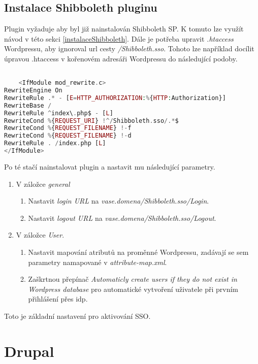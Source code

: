 \subsection{Instalace Shibboleth pluginu} %
Plugin vyžaduje aby byl již nainstalován Shibboleth SP. K tomuto lze využít návod v této sekci \ref{instalaceShibboleth}. Dále je potřeba upravit \emph{.htaccess} Wordpressu, aby ignoroval url cesty \emph{/Shibboleth.sso}. Tohoto lze například docílit úpravou .htaccess v kořenovém adresáři Wordpressu do následující podoby.

\begin{lstlisting}[language=php]

    <IfModule mod_rewrite.c>
RewriteEngine On
RewriteRule .* - [E=HTTP_AUTHORIZATION:%{HTTP:Authorization}]
RewriteBase /
RewriteRule ^index\.php$ - [L]
RewriteCond %{REQUEST_URI} !^/Shibboleth.sso/.*$
RewriteCond %{REQUEST_FILENAME} !-f
RewriteCond %{REQUEST_FILENAME} !-d
RewriteRule . /index.php [L]
</IfModule>


\end{lstlisting}

Po té stačí nainstalovat plugin a nastavit mu následující parametry.

\begin{enumerate}
    \item V záložce \emph{general}
    \begin{enumerate}
        \item Nastavit \emph{login URL} na \emph{vase.domena/Shibboleth.sso/Login}.
        \item Nastavit \emph{logout URL} na \emph{vase.domena/Shibboleth.sso/Logout}.
    \end{enumerate}
    \item V záložce \emph{User}.
     \begin{enumerate}
        \item Nastavit mapování atributů na proměnné Wordpressu, zadávají se sem parametry namapované v \emph{attribute-map.xml}.
        \item Zaškrtnou přepínač \emph{Automaticly create users if they do not exist in Wordpress database} pro automatické vytvoření uživatele při prvním přihlášení přes idp.
     \end{enumerate}
\end{enumerate}

Toto je základní nastavení pro aktivování SSO.

\section{Drupal} %

